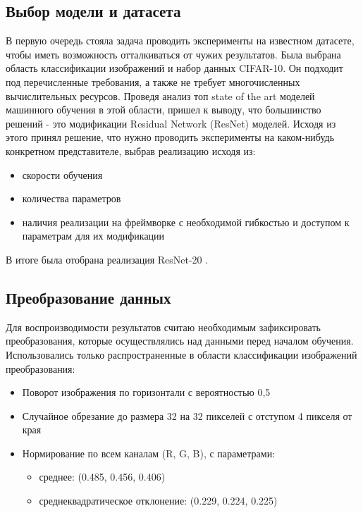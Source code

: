 \documentclass[a4paper,article,14pt]{extarticle}
\begin{document}
\subsection{Выбор модели и датасета}
В первую очередь стояла задача проводить эксперименты на известном датасете, чтобы иметь возможность отталкиваться от чужих результатов. Была выбрана область классификации изображений и набор данных \flqq CIFAR-10\frqq. Он подходит под перечисленные требования, а также не требует многочисленных вычислительных ресурсов. Проведя анализ топ state of the art моделей машинного обучения в этой области, пришел к выводу, что большинство решений - это модификации Residual Network (ResNet) моделей. Исходя из этого принял решение, что нужно проводить эксперименты на каком-нибудь конкретном представителе, выбрав реализацию исходя из:
\begin{itemize}
    \item скорости обучения
    \item количества параметров
    \item наличия реализации на фреймворке с необходимой гибкостью и доступом к параметрам для их модификации
\end{itemize}

В итоге была отобрана реализация ResNet-20 \cite{github_resnet}.


\subsection{Преобразование данных}
Для воспроизводимости результатов считаю необходимым зафиксировать преобразования, которые осуществлялись над данными перед началом обучения.
Использовались только распространенные в области классификации изображений преобразования:
\begin{itemize}
\item Поворот изображения по горизонтали с вероятностью 0,5
\item Случайное обрезание до размера 32 на 32 пикселей с отступом 4 пикселя от края
\item Нормирование по всем каналам (R, G, B), с параметрами:
    \begin{itemize}
        \item  среднее: (0.485, 0.456, 0.406)
        \item среднеквадратическое отклонение: (0.229, 0.224, 0.225)
    \end{itemize}
\end{itemize}
\end{document}
